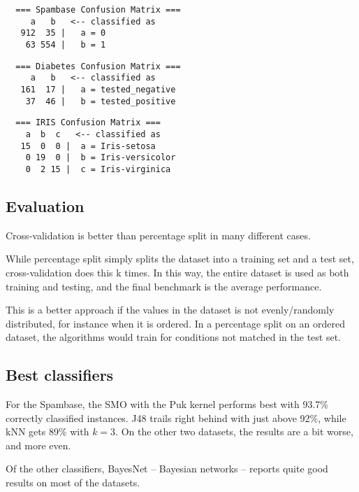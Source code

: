 \documentclass[11pt,a4paper]{article}
\begin{document}
\begin{verbatim}
  === Spambase Confusion Matrix ===
     a   b   <-- classified as
   912  35 |   a = 0
    63 554 |   b = 1
\end{verbatim}

\begin{verbatim}
  === Diabetes Confusion Matrix ===
     a   b   <-- classified as
   161  17 |   a = tested_negative
    37  46 |   b = tested_positive
\end{verbatim}

\begin{verbatim}
  === IRIS Confusion Matrix ===
    a  b  c   <-- classified as
   15  0  0 |  a = Iris-setosa
    0 19  0 |  b = Iris-versicolor
    0  2 15 |  c = Iris-virginica
\end{verbatim}

\subsection{Evaluation}

Cross-validation is better than percentage split in many different cases.

While percentage split simply splits the dataset into a training set and a test set, cross-validation does this k times. In this way, the entire dataset is used as both training and testing, and the final benchmark is the average performance.

This is a better approach if the values in the dataset is not evenly/randomly distributed, for instance when it is ordered. In a percentage split on an ordered dataset, the algorithms would train for conditions not matched in the test set.

\subsection{Best classifiers}

For the Spambase, the SMO with the Puk kernel performs best with 93.7\% correctly classified instances. J48 trails right behind with just above 92\%, while kNN gets 89\% with $k = 3$. On the other two datasets, the results are a bit worse, and more even.

Of the other classifiers, BayesNet -- Bayesian networks -- reports quite good results on most of the datasets.

\end{document}
